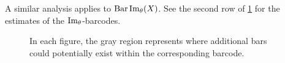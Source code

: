 A similar analysis applies to $\operatorname{Bar}\operatorname{Im}_\theta(X)$.
See the second row of \cref{fig:barcodes_general} for the estimates of the $\operatorname{Im}_\theta$-barcodes.

\begin{figure}
	\centering
	
	\caption{In each figure, the gray region represents where additional bars could potentially exist within the corresponding barcode.}
	\label{fig:barcodes_general}
\end{figure}